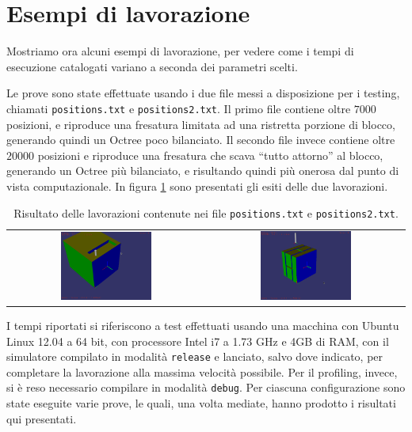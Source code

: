 \section{Esempi di lavorazione}
Mostriamo ora alcuni esempi di lavorazione, per vedere come i tempi di esecuzione catalogati variano a seconda dei parametri scelti.

Le prove sono state effettuate usando i due file messi a disposizione per i testing, chiamati \texttt{positions.txt} e \texttt{positions2.txt}. Il primo file contiene oltre $7000$ posizioni, e riproduce una fresatura limitata ad una ristretta porzione di blocco, generando quindi un Octree poco bilanciato. Il secondo file invece contiene oltre $20000$ posizioni e riproduce una fresatura che scava ``tutto attorno'' al blocco, generando un Octree più bilanciato, e risultando quindi più onerosa dal punto di vista computazionale. In figura \ref{tab:lavfinali} sono presentati gli esiti delle due lavorazioni.
\begin{table}[h]
	\centering
	\begin{tabular}{cc}
	\includegraphics[width=0.48\textwidth]{img/screenshots/pos_box_v05_1.png} &%
	\includegraphics[width=0.48\textwidth]{img/screenshots/pos2_box_v1_2.png}\\
	\end{tabular}
	\caption{Risultato delle lavorazioni contenute nei file \texttt{positions.txt} e \texttt{positions2.txt}.}
	\label{tab:lavfinali}
\end{table}
I tempi riportati si riferiscono a test effettuati usando una macchina con Ubuntu Linux 12.04 a 64 bit, con processore Intel i7 a 1.73 GHz e 4GB di RAM, con il simulatore compilato in modalità \verb!release! e lanciato, salvo dove indicato, per completare la lavorazione alla massima velocità possibile. Per il profiling, invece, si è reso necessario compilare in modalità \verb!debug!. Per ciascuna configurazione sono state eseguite varie prove, le quali, una volta mediate, hanno prodotto i risultati qui presentati.


